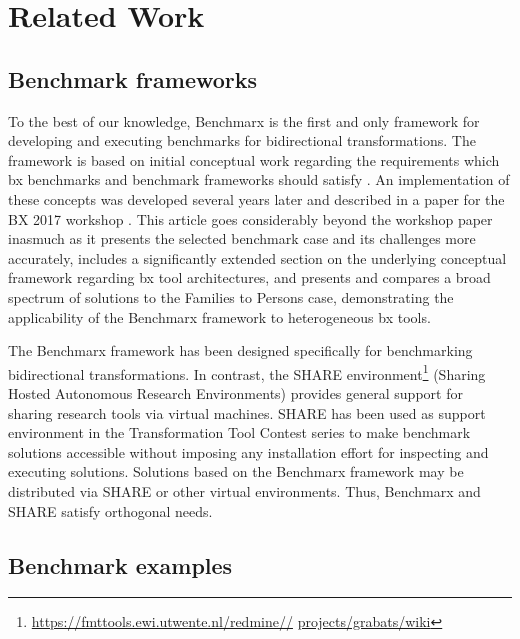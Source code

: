 \section{Related Work}
\label{sec:RelatedWork}



\subsection{Benchmark frameworks}
\label{sec:BenchmarkFrameworks}

To the best of our knowledge, Benchmarx is the first and only framework for developing and executing benchmarks for bidirectional transformations. The framework is based on initial conceptual work regarding the requirements which bx benchmarks and benchmark frameworks should satisfy \cite{AnjorinCG0RS14}. An implementation of these concepts was developed several years later and described in a paper for the BX 2017 workshop \cite{Anjorin2017}. This article goes considerably beyond the workshop paper inasmuch as it presents the selected benchmark case and its challenges more accurately, includes a significantly extended section on the underlying conceptual framework regarding bx tool architectures, and presents and compares a broad spectrum of solutions to the Families to Persons case, demonstrating the applicability of the Benchmarx framework to heterogeneous bx tools. 

The Benchmarx framework has been designed specifically for benchmarking bidirectional transformations. In contrast, the SHARE environment\footnote{\url{https://fmttools.ewi.utwente.nl/redmine//} \url{projects/grabats/wiki}} (Sharing Hosted Autonomous Research Environments) provides general support for sharing research tools via virtual machines. SHARE has been used as support environment in the Transformation Tool Contest series to make benchmark solutions accessible without imposing any installation effort for inspecting and executing solutions. Solutions based on the Benchmarx framework may be distributed via SHARE or other virtual environments. Thus, Benchmarx and SHARE satisfy orthogonal needs.    

\subsection{Benchmark examples}
\label{sec:BenchmarkExamples}


